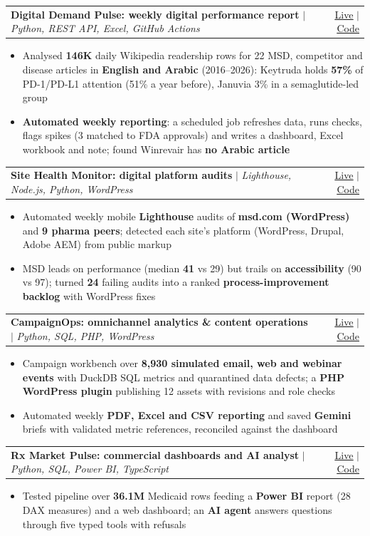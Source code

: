 \documentclass[letterpaper,10pt]{article}
\makeatletter
\newcommand{\resumeItem}[1]{
  \item\small{
    {#1 \vspace{-2pt}}
  }
}
\newcommand{\resumeProjectHeading}[2]{
    \item
    \begin{tabular*}{0.97\textwidth}{l@{\extracolsep{\fill}}r}
      \small#1 & #2 \\
    \end{tabular*}\vspace{-7pt}
}
\newcommand{\resumeItemListStart}{\begin{itemize}}
\newcommand{\resumeItemListEnd}{\end{itemize}\vspace{-5pt}}
\newcommand{\link}[2]{\href{#1}{\underline{#2}}}
\newcommand{\rxrepo}{https://github.com/f20230125-sudo/rx-market-pulse}
\newcommand{\rxlive}{https://rx-market-pulse.vercel.app}
\newcommand{\colive}{https://campaignops-digital-solutions.vercel.app}
\newcommand{\corepo}{https://github.com/f20230125-sudo/campaignops-digital-solutions}
\newcommand{\dprepo}{https://github.com/f20230125-sudo/digital-demand-pulse}
\newcommand{\dplive}{https://digital-demand-pulse.vercel.app}
\newcommand{\shrepo}{https://github.com/f20230125-sudo/site-health-monitor}
\newcommand{\shlive}{https://pharma-site-health.vercel.app}
\makeatother
\begin{document}
    \resumeProjectHeading
      {\textbf{Digital Demand Pulse: weekly digital performance report} $|$ \emph{Python, REST API, Excel, GitHub Actions}}
      {\link{\dplive}{Live} $|$ \link{\dprepo}{Code}}
      \resumeItemListStart
        \resumeItem{Analysed \textbf{146K} daily Wikipedia readership rows for 22 MSD, competitor and disease articles in \textbf{English and Arabic} (2016--2026): Keytruda holds \textbf{57\%} of PD-1/PD-L1 attention (51\% a year before), Januvia 3\% in a semaglutide-led group}
        \resumeItem{\textbf{Automated weekly reporting}: a scheduled job refreshes data, runs checks, flags spikes (3 matched to FDA approvals) and writes a dashboard, Excel workbook and note; found Winrevair has \textbf{no Arabic article}}
      \resumeItemListEnd

    \resumeProjectHeading
      {\textbf{Site Health Monitor: digital platform audits} $|$ \emph{Lighthouse, Node.js, Python, WordPress}}
      {\link{\shlive}{Live} $|$ \link{\shrepo}{Code}}
      \resumeItemListStart
        \resumeItem{Automated weekly mobile \textbf{Lighthouse} audits of \textbf{msd.com (WordPress)} and \textbf{9 pharma peers}; detected each site's platform (WordPress, Drupal, Adobe AEM) from public markup}
        \resumeItem{MSD leads on performance (median \textbf{41} vs 29) but trails on \textbf{accessibility} (90 vs 97); turned \textbf{24} failing audits into a ranked \textbf{process-improvement backlog} with WordPress fixes}
      \resumeItemListEnd

    \resumeProjectHeading
      {\textbf{CampaignOps: omnichannel analytics \& content operations} $|$ \emph{Python, SQL, PHP, WordPress}}
      {\link{\colive}{Live} $|$ \link{\corepo}{Code}}
      \resumeItemListStart
        \resumeItem{Campaign workbench over \textbf{8,930 simulated email, web and webinar events} with DuckDB SQL metrics and quarantined data defects; a \textbf{PHP WordPress plugin} publishing 12 assets with revisions and role checks}
        \resumeItem{Automated weekly \textbf{PDF, Excel and CSV reporting} and saved \textbf{Gemini} briefs with validated metric references, reconciled against the dashboard}
      \resumeItemListEnd

    \resumeProjectHeading
      {\textbf{Rx Market Pulse: commercial dashboards and AI analyst} $|$ \emph{Python, SQL, Power BI, TypeScript}}
      {\link{\rxlive}{Live} $|$ \link{\rxrepo}{Code}}
      \resumeItemListStart
        \resumeItem{Tested pipeline over \textbf{36.1M} Medicaid rows feeding a \textbf{Power BI} report (28 DAX measures) and a web dashboard; an \textbf{AI agent} answers questions through five typed tools with refusals}
      \resumeItemListEnd
\end{document}
